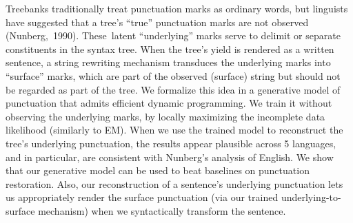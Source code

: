 Treebanks traditionally treat punctuation marks as ordinary words, but linguists have suggested that a tree’s “true” punctuation marks are not observed (Nunberg, 1990). These latent “underlying” marks serve to delimit or separate constituents in the syntax tree. When the tree’s yield is rendered as a written sentence, a string rewriting mechanism transduces the underlying marks into “surface” marks, which are part of the observed (surface) string but should not be regarded as part of the tree. We formalize this idea in a generative model of punctuation that admits efficient dynamic programming. We train it without observing the underlying marks, by locally maximizing the incomplete data likelihood (similarly to EM). When we use the trained model to reconstruct the tree’s underlying punctuation, the results appear plausible across 5 languages, and in particular, are consistent with Nunberg’s analysis of English. We show that our generative model can be used to beat baselines on punctuation restoration. Also, our reconstruction of a sentence’s underlying punctuation lets us appropriately render the surface punctuation (via our trained underlying-to-surface mechanism) when we syntactically transform the sentence.